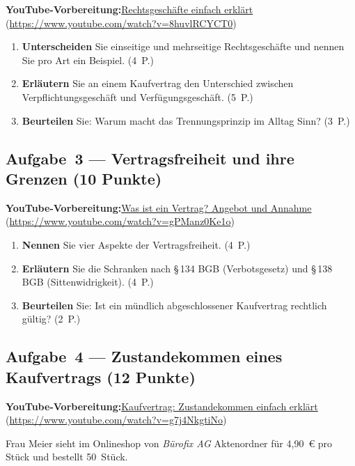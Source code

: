 \documentclass[11pt, a4paper]{article}
\begin{document}
\noindent\textbf{\color{bfwAccent}YouTube-Vorbereitung:}\enspace \href{https://www.youtube.com/watch?v=8huvlRCYCT0}{Rechtsgeschäfte einfach erklärt} (\url{https://www.youtube.com/watch?v=8huvlRCYCT0})

\medskip
\begin{enumerate}[label=(\alph*)]
  \item \textbf{Unterscheiden} Sie einseitige und mehrseitige Rechtsgeschäfte und nennen Sie pro Art ein Beispiel. \hfill (4~P.)
  \item \textbf{Erläutern} Sie an einem Kaufvertrag den Unterschied zwischen Verpflichtungs\-geschäft und Verfügungs\-geschäft. \hfill (5~P.)
  \item \textbf{Beurteilen} Sie: Warum macht das Trennungs\-prinzip im Alltag Sinn? \hfill (3~P.)
\end{enumerate}

\subsection*{Aufgabe~3 --- Vertragsfreiheit und ihre Grenzen (10 Punkte)}

\noindent\textbf{\color{bfwAccent}YouTube-Vorbereitung:}\enspace \href{https://www.youtube.com/watch?v=gPManz0Ke1o}{Was ist ein Vertrag? Angebot und Annahme} (\url{https://www.youtube.com/watch?v=gPManz0Ke1o})

\medskip
\begin{enumerate}[label=(\alph*)]
  \item \textbf{Nennen} Sie vier Aspekte der Vertragsfreiheit. \hfill (4~P.)
  \item \textbf{Erläutern} Sie die Schranken nach §\,134 BGB (Verbotsgesetz) und §\,138 BGB (Sittenwidrigkeit). \hfill (4~P.)
  \item \textbf{Beurteilen} Sie: Ist ein mündlich abgeschlossener Kaufvertrag rechtlich gültig? \hfill (2~P.)
\end{enumerate}

\subsection*{Aufgabe~4 --- Zustandekommen eines Kaufvertrags (12 Punkte)}

\noindent\textbf{\color{bfwAccent}YouTube-Vorbereitung:}\enspace \href{https://www.youtube.com/watch?v=g7j4NkgtiNo}{Kaufvertrag: Zustandekommen einfach erklärt} (\url{https://www.youtube.com/watch?v=g7j4NkgtiNo})

\medskip
Frau Meier sieht im Onlineshop von \emph{Bürofix AG} Aktenordner für 4{,}90~€ pro Stück
und bestellt 50~Stück.
\end{document}
